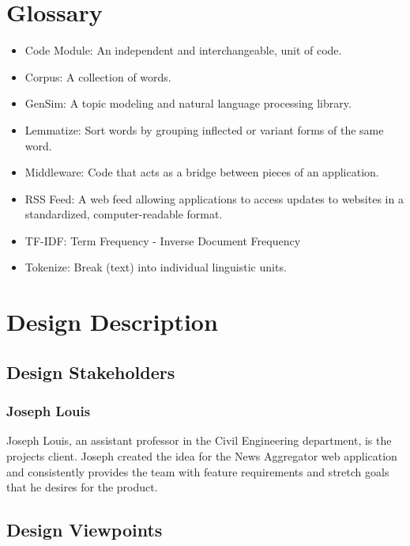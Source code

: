\documentclass[onecolumn, draftclsnofoot,10pt, compsoc]{IEEEtran}
\begin{document}
\section{Glossary}
\begin{itemize}
    \item Code Module: An independent and interchangeable, unit of code.
    \item Corpus: A collection of words.
    \item GenSim: A topic modeling and natural language processing library.
    \item Lemmatize: Sort words by grouping inflected or variant forms of the same word.
    \item Middleware: Code that acts as a bridge between pieces of an application.
    \item RSS Feed: A web feed allowing applications to access updates to websites in a standardized, computer-readable format.
    \item TF-IDF: Term Frequency - Inverse Document Frequency
    \item Tokenize: Break (text) into individual linguistic units.
\end{itemize}
\section{Design Description}
\subsection{Design Stakeholders}
\subsubsection{Joseph Louis}
Joseph Louis, an assistant professor in the Civil Engineering department, is the projects client. Joseph created the idea for the News Aggregator web application and consistently provides the team with feature requirements and stretch goals that he desires for the product.
\subsection{Design Viewpoints}
\end{document}
